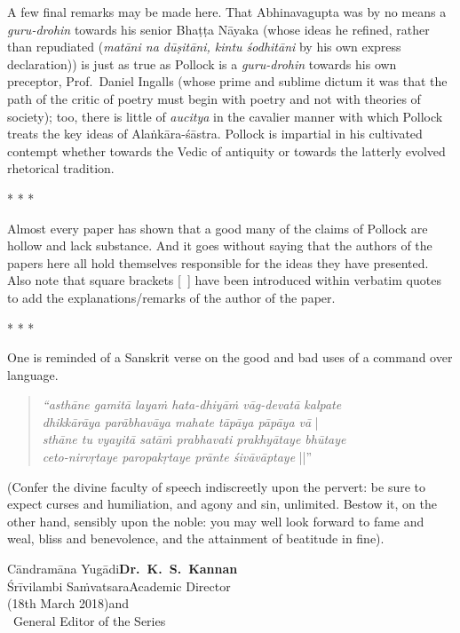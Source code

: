 A few final remarks may be made here. That Abhinavagupta was by no means a \textsl{guru-drohin} towards his senior Bhaṭṭa Nāyaka (whose ideas he refined, rather than repudiated (\textsl{matāni na dūṣitāni, kintu śodhitāni} by his own express declaration)) is just as true as Pollock is a \textsl{guru-drohin} towards his own preceptor, Prof.\ Daniel Ingalls (whose prime and sublime dictum it was that the path of the critic of poetry must begin with poetry and not with theories of society); too, there is little of \textsl{aucitya} in the cavalier manner with which Pollock treats the key ideas of Alaṅkāra-śāstra. Pollock is impartial in his cultivated contempt whether towards the Vedic of antiquity or towards the latterly evolved rhetorical tradition.
\begin{center}
* * *
\end{center}
Almost every paper has shown that a good many of the claims of Pollock are hollow and lack substance. And it goes without saying that the authors of the papers here all hold themselves responsible for the ideas they have presented. Also note that square brackets [~] have been introduced within verbatim quotes to add the explanations/remarks of the author of the paper.
\begin{center}
* * *
\end{center}
One is reminded of a Sanskrit verse on the good and bad uses of a command over language.
\begin{quote}
\textsl{“asthāne gamitā layaṁ hata-dhiyāṁ vāg-devatā kalpate}\\[2pt]
\phantom{aaaaaa}\textsl{dhikkārāya parābhavāya mahate tāpāya pāpāya vā} |\\[2pt]
\textsl{sthāne tu vyayitā satāṁ prabhavati prakhyātaye bhūtaye}\\[2pt]
\phantom{aaaaaa}\textsl{ceto-nirvṛtaye paropakṛtaye prānte śivāvāptaye} ||”
\end{quote}

\begin{normalmyquote}
(Confer the divine faculty of speech indiscreetly upon the pervert: be sure to expect curses and humiliation, and agony and sin, unlimited. Bestow it, on the other hand, sensibly upon the noble: you may well look forward to fame and weal, bliss and benevolence, and the attainment of beatitude in fine).
\end{normalmyquote}

\bigskip
\noindent
Cāndramāna Yugādi\hfill {\bf Dr.\ K.\ S.\ Kannan}\\
Śrīvilambi Saṁvatsara\hfill Academic Director\\
(18th March 2018)\hfill	and\\
~\phantom{a}\hfill  General Editor of the Series

